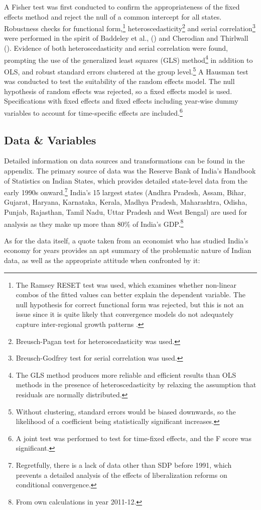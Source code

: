 \documentclass[a4paper, 11pt]{article}
\begin{document}
A Fisher test was first conducted to confirm the appropriateness of the fixed effects method and reject the null of a common intercept for all states.  Robustness checks for functional form,\footnote{The Ramsey RESET test was used, which examines whether non-linear combos of the fitted values can better explain the dependent variable.  The null hypothesis for correct functional form was rejected, but this is not an issue since it is quite likely that convergence models do not adequately capture inter-regional growth patterns \citep{baddeley_divergence_2006}.} heteroscedasticity\footnote{Breusch-Pagan test for heteroscedasticity was used.} and serial correlation\footnote{Breusch-Godfrey test for serial correlation was used.} were performed in the spirit of Baddeley et al., (\citeyear{baddeley_divergence_2006}) and Cherodian and Thirlwall (\citeyear{cherodian_regional_2015}).  Evidence of both heteroscedasticity and serial correlation were found, prompting the use of the generalized least squares (GLS) method\footnote{The GLS method produces more reliable and efficient results than OLS methods in the presence of heteroscedasticity by relaxing the assumption that residuals are normally distributed.} in addition to OLS, and robust standard errors clustered at the group level.\footnote{Without clustering, standard errors would be biased downwards, so the likelihood of a coefficient being statistically significant increases.}  A Hausman test was conducted to test the suitability of the random effects model.  The null hypothesis of random effects was rejected, so a fixed effects model is used.   Specifications with fixed effects and fixed effects including year-wise dummy variables to account for time-specific effects are included.\footnote{A joint test was performed to test for time-fixed effects, and the F score was significant.} \par

\subsection*{Data \& Variables}

Detailed information on data sources and transformations can be found in the appendix.  The primary source of data was the Reserve Bank of India’s Handbook of Statistics on Indian States, which provides detailed state-level data from the early 1990s onward.\footnote{Regretfully, there is a lack of data other than SDP before 1991, which prevents a detailed analysis of the effects of liberalization reforms on conditional convergence.}  India’s 15 largest states (Andhra Pradesh, Assam, Bihar, Gujarat, Haryana, Karnataka, Kerala, Madhya Pradesh, Maharashtra, Odisha, Punjab, Rajasthan, Tamil Nadu, Uttar Pradesh and West Bengal) are used for analysis as they make up more than 80\% of India’s GDP.\footnote{From own calculations in year 2011-12.} \par  As for the data itself, a quote taken from an economist who has studied India’s economy for years provides an apt summary of the problematic nature of Indian data, as well as the appropriate attitude when confronted by it:\par
\end{document}
